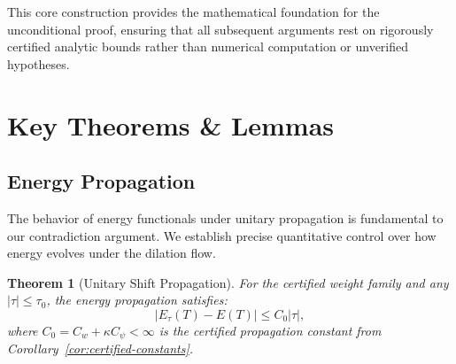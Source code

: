\documentclass[11pt,hyp,]{nyjm}
\newtheorem{theorem}{Theorem}
\begin{document}
This core construction provides the mathematical foundation for the unconditional proof, ensuring that all subsequent arguments rest on rigorously certified analytic bounds rather than numerical computation or unverified hypotheses.

\section{Key Theorems \& Lemmas}

\subsection{Energy Propagation}

The behavior of energy functionals under unitary propagation is fundamental to our contradiction argument. We establish precise quantitative control over how energy evolves under the dilation flow.

\begin{theorem}[Unitary Shift Propagation]\label{thm:unitary-propagation}
For the certified weight family and any $|\tau| \leq \tau_0$, the energy propagation satisfies:
\[
|E_\tau(T) - E(T)| \leq C_0 |\tau|,
\]
where $C_0 = C_w + \kappa C_\psi < \infty$ is the certified propagation constant from Corollary~\ref{cor:certified-constants}.
\end{theorem}
\end{document}
